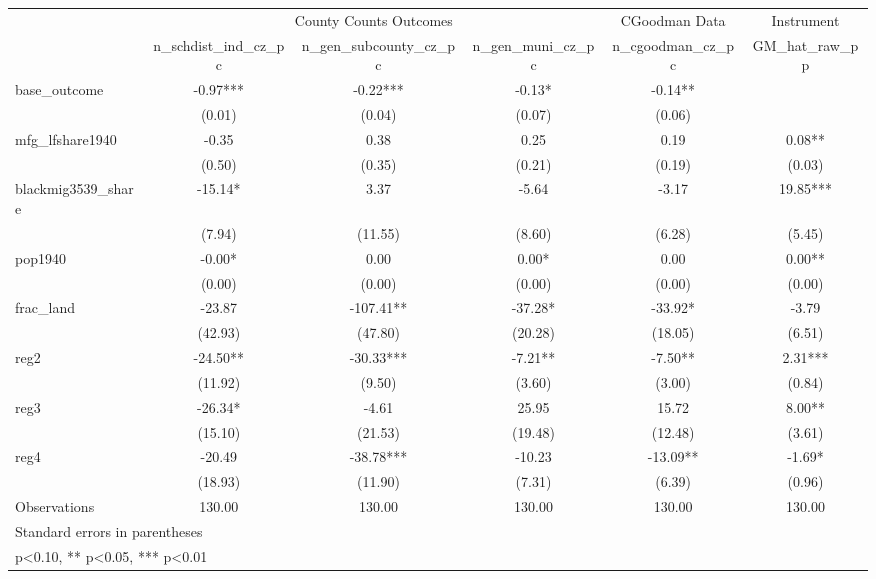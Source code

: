 {
\def\sym#1{\ifmmode^{#1}\else\(^{#1}\)\fi}
\begin{tabular}{l*{5}{c}}
\toprule
                &\multicolumn{3}{c}{County Counts Outcomes}  &\multicolumn{1}{c}{CGoodman Data}&\multicolumn{1}{c}{Instrument}\\\cmidrule(lr){2-4}\cmidrule(lr){5-5}\cmidrule(lr){6-6}
                &\multicolumn{1}{c}{n\_schdist\_ind\_cz\_pc}&\multicolumn{1}{c}{n\_gen\_subcounty\_cz\_pc}&\multicolumn{1}{c}{n\_gen\_muni\_cz\_pc}&\multicolumn{1}{c}{n\_cgoodman\_cz\_pc}&\multicolumn{1}{c}{GM\_hat\_raw\_pp}\\
\midrule
base\_outcome    &      -0.97***&      -0.22***&      -0.13*  &      -0.14** &              \\
                &     (0.01)   &     (0.04)   &     (0.07)   &     (0.06)   &              \\
\addlinespace
mfg\_lfshare1940 &      -0.35   &       0.38   &       0.25   &       0.19   &       0.08** \\
                &     (0.50)   &     (0.35)   &     (0.21)   &     (0.19)   &     (0.03)   \\
\addlinespace
blackmig3539\_share&     -15.14*  &       3.37   &      -5.64   &      -3.17   &      19.85***\\
                &     (7.94)   &    (11.55)   &     (8.60)   &     (6.28)   &     (5.45)   \\
\addlinespace
pop1940         &      -0.00*  &       0.00   &       0.00*  &       0.00   &       0.00** \\
                &     (0.00)   &     (0.00)   &     (0.00)   &     (0.00)   &     (0.00)   \\
\addlinespace
frac\_land       &     -23.87   &    -107.41** &     -37.28*  &     -33.92*  &      -3.79   \\
                &    (42.93)   &    (47.80)   &    (20.28)   &    (18.05)   &     (6.51)   \\
\addlinespace
reg2            &     -24.50** &     -30.33***&      -7.21** &      -7.50** &       2.31***\\
                &    (11.92)   &     (9.50)   &     (3.60)   &     (3.00)   &     (0.84)   \\
\addlinespace
reg3            &     -26.34*  &      -4.61   &      25.95   &      15.72   &       8.00** \\
                &    (15.10)   &    (21.53)   &    (19.48)   &    (12.48)   &     (3.61)   \\
\addlinespace
reg4            &     -20.49   &     -38.78***&     -10.23   &     -13.09** &      -1.69*  \\
                &    (18.93)   &    (11.90)   &     (7.31)   &     (6.39)   &     (0.96)   \\
\midrule
Observations    &     130.00   &     130.00   &     130.00   &     130.00   &     130.00   \\
\bottomrule
\multicolumn{6}{l}{\footnotesize Standard errors in parentheses}\\
\multicolumn{6}{l}{\footnotesize * p<0.10, ** p<0.05, *** p<0.01}\\
\end{tabular}
}
